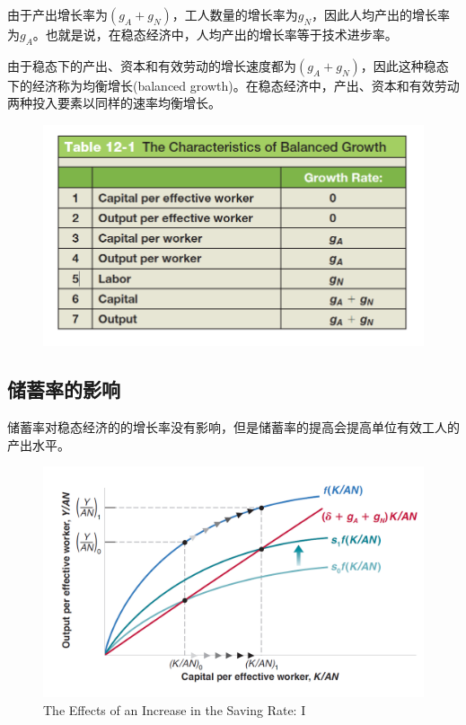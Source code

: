 \documentclass{article}
\begin{document}
由于产出增长率为$ (g_A+g_N) $，工人数量的增长率为$ g_N $，因此人均产出的增长率为$ g_A $。也就是说，在稳态经济中，人均产出的增长率等于技术进步率。

由于稳态下的产出、资本和有效劳动的增长速度都为$ (g_A+g_N) $，因此这种稳态下的经济称为均衡增长(balanced growth)。在稳态经济中，产出、资本和有效劳动两种投入要素以同样的速率均衡增长。

\begin{figure}[H] %
	\centering %
	\includegraphics[width=1\textwidth]{12_3} %
	\label{Fig.main4} %
\end{figure}

\subsection{储蓄率的影响}

储蓄率对稳态经济的的增长率没有影响，但是储蓄率的提高会提高单位有效工人的产出水平。

\begin{figure}[H] %
	\centering %
	\includegraphics[width=1\textwidth]{12_4} %
	\caption{The Effects of an Increase
		in the Saving Rate: I} %
	\label{Fig.main5} %
\end{figure}
\end{document}
